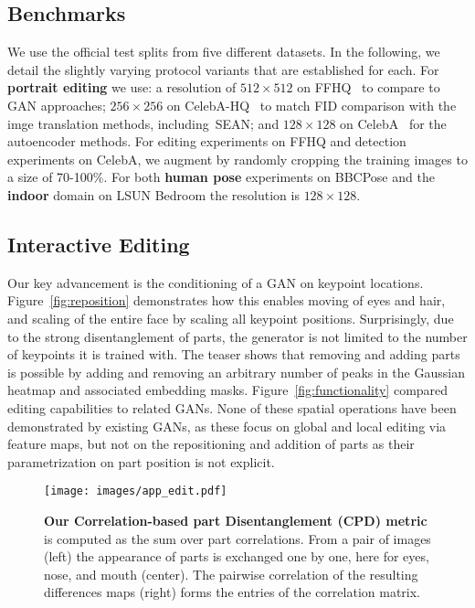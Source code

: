 \documentclass[10pt, conference, compsocconf]{IEEEtran}
\begin{document}
\subsection{Benchmarks} We use the official test splits from five different datasets. In the following, we detail the slightly varying protocol variants that are established for each.
For \textbf{portrait editing} we use: a resolution of $512\times 512$ on FFHQ~\cite{karras2019style} to compare to GAN approaches; $256\times256$ on CelebA-HQ~\cite{zhu2020sean} to match FID comparison with the imge translation methods, including~SEAN; and $128\times 128$ on CelebA~\cite{liu2015faceattributes} for the autoencoder methods. For editing experiments on FFHQ and detection experiments on CelebA, we augment by randomly cropping the training images to a size of 70-100\%.
For both \textbf{human pose} experiments on BBCPose \cite{charles2013domain} and the \textbf{indoor} domain on LSUN Bedroom \cite{yu2015lsun} the resolution is $128\times 128$.


















\subsection{Interactive Editing}
\label{sec: qualitative results}

Our key advancement is the conditioning of a GAN on keypoint locations. Figure~\ref{fig:reposition} demonstrates how this enables moving of eyes and hair, and scaling of the entire face by scaling all keypoint positions. Surprisingly, due to the strong disentanglement of parts, the generator is not limited to the number of keypoints it is trained with. The teaser shows that removing and adding parts is possible by adding and removing an arbitrary number of peaks in the Gaussian heatmap and associated embedding masks. 
Figure~\ref{fig:functionality} compared editing capabilities to related GANs. None of these spatial operations have been demonstrated by existing GANs, as these focus on global and local editing via feature maps, but not on the repositioning and addition of parts as their parametrization on part position is not explicit. 


\begin{figure}[t]
\begin{center}
\texttt{[image: images/app\_edit.pdf]}
\vspace{-10pt}
\end{center}
  \caption{\textbf{Our Correlation-based part Disentanglement (CPD) metric} is computed as the sum over part correlations. From a pair of images (left) the appearance of parts is exchanged one by one, here for eyes, nose, and mouth (center). The pairwise correlation of the resulting differences maps (right) forms the entries of the correlation matrix.}
\label{fig:CPD}
\end{figure}
\end{document}
